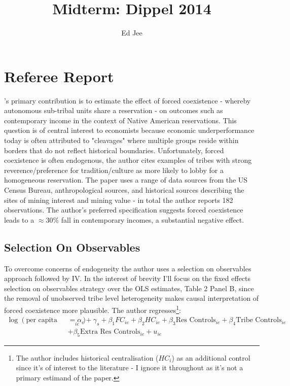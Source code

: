 \documentclass[12pt]{article}
\author{Ed Jee}
\title{Midterm: Dippel 2014}
\begin{document}


\section{Referee Report}

\cite{dippel}'s primary contribution is to estimate the effect of forced coexistence - whereby autonomous sub-tribal units share a 
reservation - on outcomes such as contemporary income in the context of Native American reservations. This question is of central interest to economists because economic underperformance
today is often attributed to "cleavages" where multiple groups reside within borders that do not reflect historical boundaries. Unfortunately, 
forced coexistence is often endogenous, the author cites examples of tribes with strong reverence/preference for tradition/culture as more likely 
to lobby for a homogeneous reservation. The paper uses a range of data sources from the US Census Bureau, anthropological sources, and historical 
sources describing the sites of mining interest and mining value - in total the author reports 182 observations. The author's preferred specification suggests forced coexistence leads to a $\approx 30\%$ fall in contemporary 
incomes, a substantial negative effect.

\subsection{Selection On Observables}
To overcome concerns of endogeneity the author uses a selection on observables approach followed by IV. In the interest of brevity I'll focus 
on the fixed effects selection on observables strategy over the OLS estimates, Table 2 Panel B, since the removal of unobserved tribe level heterogeneity 
makes causal interpretation of forced coexistence more plausible.  The author regresses\footnote{The author includes historical centralisation ($HC_i$) as an additional 
control since it's of interest to the literature - I ignore it throughout as it's not a primary estimand of the paper.}:
\begin{align*}
    \log(\text{per capita income})_{ie} &= \alpha_e + \gamma_s + \beta_1 FC_{ie} + \beta_2 HC_{ie}+ \beta_3 \text{Res Controls}_{ie} + \beta_4 \text{Tribe Controls}_{ie}  \\
    &+ \beta_5 \text{Extra Res Controls}_{ie} + u_{ie} 
\end{align*}
  
\end{document}

